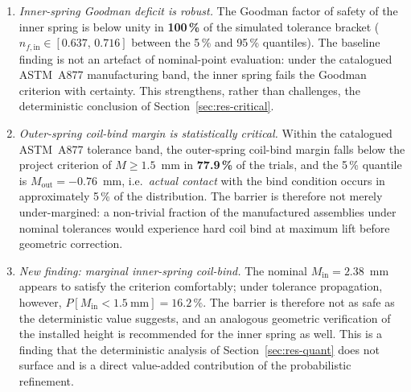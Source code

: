 \begin{enumerate}
\item \emph{Inner-spring Goodman deficit is robust.} The Goodman
factor of safety of the inner spring is below unity in
\textbf{100\,\%} of the simulated tolerance bracket
($n_{f,\mathrm{in}}\in[0.637,\,0.716]$ between the 5\,\% and 95\,\%
quantiles). The baseline finding is not an artefact of nominal-point
evaluation: under the catalogued ASTM~A877 manufacturing band, the
inner spring fails the Goodman criterion with certainty. This
strengthens, rather than challenges, the deterministic conclusion of
Section~\ref{sec:res-critical}.
\item \emph{Outer-spring coil-bind margin is statistically critical.}
Within the catalogued ASTM~A877 tolerance band, the outer-spring
coil-bind margin falls below the project criterion of
$M\geq 1.5$~mm in \textbf{77.9\,\%} of the trials, and the 5\,\%
quantile is $M_{\mathrm{out}}=-0.76$~mm, i.e.\ \emph{actual contact}
with the bind condition occurs in approximately 5\,\% of the
distribution. The barrier is therefore not merely under-margined: a
non-trivial fraction of the manufactured assemblies under nominal
tolerances would experience hard coil bind at maximum lift before
geometric correction.
\item \emph{New finding: marginal inner-spring coil-bind.} The
nominal $M_{\mathrm{in}}=2.38$~mm appears to satisfy the criterion
comfortably; under tolerance propagation, however,
$P[M_{\mathrm{in}}<1.5~\mathrm{mm}]=16.2\,\%$. The barrier is
therefore not as safe as the deterministic value suggests, and an
analogous geometric verification of the installed height is
recommended for the inner spring as well. This is a finding that the
deterministic analysis of Section~\ref{sec:res-quant} does not
surface and is a direct value-added contribution of the probabilistic
refinement.
\end{enumerate}

